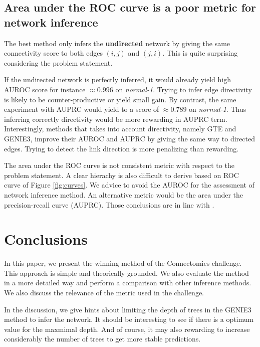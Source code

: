 \documentclass[wcp]{jmlr}
\begin{document}
\subsection*{Area under the ROC curve is a poor metric for network inference}

The best method only infers the \textbf{undirected} network by giving the
same connectivity score to both edges $(i,j)$ and $(j,i)$. This is quite
surprising considering the problem statement.

If the undirected network is perfectly inferred, it would already yield
high AUROC score for instance $\approx{}0.996$ on \textit{normal-1}. Trying
to infer edge directivity is likely to be counter-productive or yield
small gain.
By contrast, the same experiment with AUPRC would yield
to a score of $\approx 0.789$ on \textit{normal-1}. Thus inferring
correctly directivity would be more rewarding in AUPRC term.
Interestingly, methods that takes into account directivity, namely GTE and
GENIE3, improve their AUROC and AUPRC by giving the same way to directed edges.
Trying to detect the link direction is more penalizing than rewarding.

The area under the ROC curve is not consistent metric
with respect to the problem statement. A clear hierachy is also difficult to derive based on ROC curve of Figure \ref{fig:curves}. We advice to avoid the AUROC
for the assessment of network inference method. An alternative metric would
be the area under the precision-recall curve (AUPRC). Those
conclusions are in line with \cite{schrynemackers2013protocols}.


\section{Conclusions} \label{sec:conclusion}





In this paper, we present the winning method of the Connectomics challenge.
This approach is simple and theorically grounded. We also evaluate the method
in a more detailed way and perform a comparison with other inference methods.
We also discuss the relevance of the metric used in the challenge.

In the discussion, we give hints about limiting the depth of trees in the GENIE3
method to infer the network. It should be interesting to see if there is a
optimum value for the maxmimal depth. And of course, it may also rewarding to increase considerably the number of trees to get more stable predictions.
\end{document}
